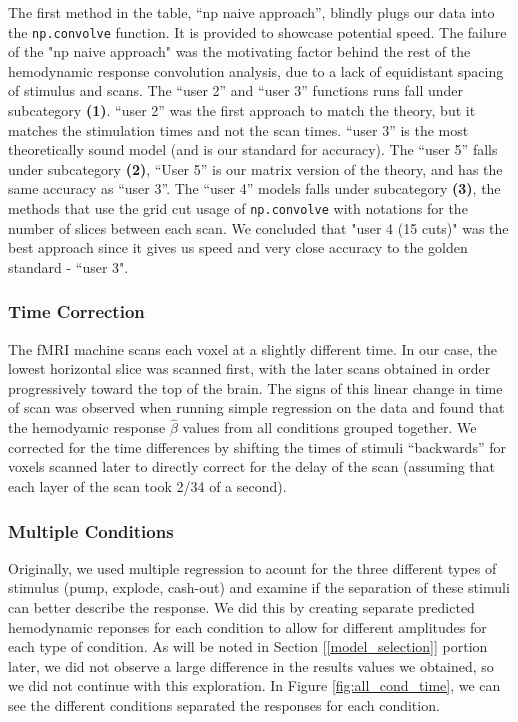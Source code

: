 \par \noindent The first method in the table, ``np naive approach'', blindly 
plugs our data into the \texttt{np.convolve} function. It is provided to 
showcase potential speed. The failure of the "np naive approach" was the 
motivating factor behind the rest of the hemodynamic response convolution 
analysis, due to a lack of equidistant spacing of stimulus and scans. The 
``user 2'' and ``user 3'' functions runs fall under subcategory 
\textbf{(1)}. ``user 2'' was the first approach to
match the theory, but it matches the stimulation times and not the scan times.
``user 3'' is the most theoretically sound model (and is our standard for 
accuracy). The ``user 5'' falls under subcategory \textbf{(2)}, ``User 5''  is
our matrix version of the theory, and has the same accuracy as ``user 3''. The 
``user 4'' models falls under subcategory \textbf{(3)}, the methods that use the
grid cut usage of \texttt{np.convolve} with notations for the number of slices 
between each scan. We concluded that "user 4 (15 cuts)" was the best approach 
since it gives us speed and very close accuracy to the golden standard - ``user 
3".

\subsubsection{Time Correction}

\par \indent The fMRI machine scans each voxel at a slightly different time. 
In our case, the lowest horizontal slice was scanned first, with the later 
scans obtained in order progressively toward the top of the brain. The signs 
of this linear change in time of scan was observed when running simple 
regression on the data and found that the hemodyamic response $\hat{\beta}$ 
values from all conditions grouped together. We corrected for the time 
differences by shifting the times of stimuli ``backwards'' for voxels scanned 
later to directly correct for the delay of the scan (assuming that each layer 
of the scan took 2/34 of a second).

\subsubsection{Multiple Conditions}

\par \indent Originally, we used multiple regression to acount for the 
three different types of stimulus (pump, explode, cash-out) and examine if the 
separation of these stimuli can better describe the response. We did this by 
creating separate predicted hemodynamic reponses for each condition to allow 
for different amplitudes for each type of condition. As will be noted in 
Section [\ref{model_selection}] portion later, we did not observe a large 
difference in the results values we obtained, so we did not continue with 
this exploration. In Figure \ref{fig:all_cond_time}, we can see the different 
conditions separated the responses for each condition.
 

